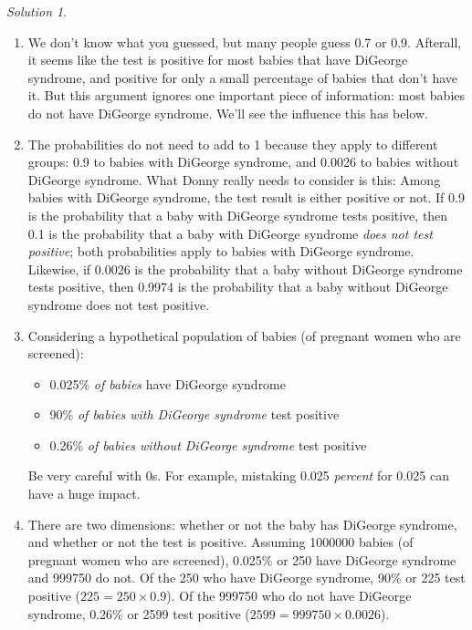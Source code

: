 \documentclass[
  letterpaper,
  DIV=11,
  numbers=noendperiod]{scrreprt}
\providecommand{\tightlist}{%
  \setlength{\itemsep}{0pt}\setlength{\parskip}{0pt}}
\theoremstyle{plain}
\theoremstyle{definition}
\theoremstyle{definition}
\theoremstyle{definition}
\theoremstyle{remark}
\newtheorem{refsolution}{Solution}[chapter]
\begin{document}
\begin{tcolorbox}[enhanced jigsaw, opacityback=0, rightrule=.15mm, coltitle=black, colframe=quarto-callout-tip-color-frame, toprule=.15mm, colbacktitle=quarto-callout-tip-color!10!white, opacitybacktitle=0.6, left=2mm, toptitle=1mm, breakable, title={Solution (click to expand)}, bottomtitle=1mm, colback=white, leftrule=.75mm, titlerule=0mm, arc=.35mm, bottomrule=.15mm]

\begin{refsolution}
\leavevmode

\begin{enumerate}
\def\labelenumi{\arabic{enumi}.}
\item
  We don't know what you guessed, but many people guess 0.7 or 0.9.
  Afterall, it seems like the test is positive for most babies that have
  DiGeorge syndrome, and positive for only a small percentage of babies
  that don't have it. But this argument ignores one important piece of
  information: most babies do not have DiGeorge syndrome. We'll see the
  influence this has below.
\item
  The probabilities do not need to add to 1 because they apply to
  different groups: 0.9 to babies with DiGeorge syndrome, and 0.0026 to
  babies without DiGeorge syndrome. What Donny really needs to consider
  is this: Among babies with DiGeorge syndrome, the test result is
  either positive or not. If 0.9 is the probability that a baby with
  DiGeorge syndrome tests positive, then 0.1 is the probability that a
  baby with DiGeorge syndrome \emph{does not test positive}; both
  probabilities apply to babies with DiGeorge syndrome. Likewise, if
  0.0026 is the probability that a baby without DiGeorge syndrome tests
  positive, then 0.9974 is the probability that a baby without DiGeorge
  syndrome does not test positive\footnotemark{}.
\item
  Considering a hypothetical population of babies (of pregnant women who
  are screened):

  \begin{itemize}
  \tightlist
  \item
    0.025\% \emph{of babies} have DiGeorge syndrome
  \item
    90\% \emph{of babies with DiGeorge syndrome} test positive
  \item
    0.26\% \emph{of babies without DiGeorge syndrome} test positive
  \end{itemize}

  Be very careful with 0s. For example, mistaking 0.025 \emph{percent}
  for 0.025 can have a huge impact.
\item
  There are two dimensions: whether or not the baby has DiGeorge
  syndrome, and whether or not the test is positive. Assuming 1000000
  babies (of pregnant women who are screened), 0.025\% or 250 have
  DiGeorge syndrome and 999750 do not. Of the 250 who have DiGeorge
  syndrome, 90\% or 225 test positive (\(225 = 250 \times 0.9\)). Of the
  999750 who do not have DiGeorge syndrome, 0.26\% or 2599 test positive
  (\(2599 = 999750 \times 0.0026\)).


\end{enumerate}
\end{refsolution}
\end{tcolorbox}
\end{document}
